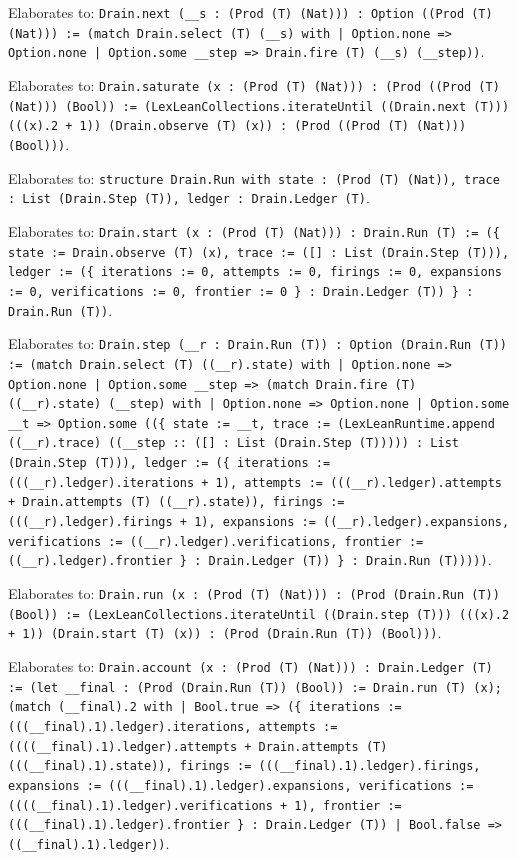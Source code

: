 \documentclass[11pt]{article}
\begin{document}
\noindent Elaborates to: \texttt{Drain.next (\_\_s : (Prod (T) (Nat))) : Option ((Prod (T) (Nat))) := (match Drain.select (T) (\_\_s) with | Option.none => Option.none | Option.some \_\_step => Drain.fire (T) (\_\_s) (\_\_step))}.\par
\noindent Elaborates to: \texttt{Drain.saturate (x : (Prod (T) (Nat))) : (Prod ((Prod (T) (Nat))) (Bool)) := (LexLeanCollections.iterateUntil ((Drain.next (T))) (((x).2 + 1)) (Drain.observe (T) (x)) : (Prod ((Prod (T) (Nat))) (Bool)))}.\par
\noindent Elaborates to: \texttt{structure Drain.Run with state : (Prod (T) (Nat)), trace : List (Drain.Step (T)), ledger : Drain.Ledger (T)}.\par
\noindent Elaborates to: \texttt{Drain.start (x : (Prod (T) (Nat))) : Drain.Run (T) := (\{ state := Drain.observe (T) (x), trace := ([] : List (Drain.Step (T))), ledger := (\{ iterations := 0, attempts := 0, firings := 0, expansions := 0, verifications := 0, frontier := 0 \} : Drain.Ledger (T)) \} : Drain.Run (T))}.\par
\noindent Elaborates to: \texttt{Drain.step (\_\_r : Drain.Run (T)) : Option (Drain.Run (T)) := (match Drain.select (T) ((\_\_r).state) with | Option.none => Option.none | Option.some \_\_step => (match Drain.fire (T) ((\_\_r).state) (\_\_step) with | Option.none => Option.none | Option.some \_\_t => Option.some ((\{ state := \_\_t, trace := (LexLeanRuntime.append ((\_\_r).trace) ((\_\_step :: ([] : List (Drain.Step (T))))) : List (Drain.Step (T))), ledger := (\{ iterations := (((\_\_r).ledger).iterations + 1), attempts := (((\_\_r).ledger).attempts + Drain.attempts (T) ((\_\_r).state)), firings := (((\_\_r).ledger).firings + 1), expansions := ((\_\_r).ledger).expansions, verifications := ((\_\_r).ledger).verifications, frontier := ((\_\_r).ledger).frontier \} : Drain.Ledger (T)) \} : Drain.Run (T)))))}.\par
\noindent Elaborates to: \texttt{Drain.run (x : (Prod (T) (Nat))) : (Prod (Drain.Run (T)) (Bool)) := (LexLeanCollections.iterateUntil ((Drain.step (T))) (((x).2 + 1)) (Drain.start (T) (x)) : (Prod (Drain.Run (T)) (Bool)))}.\par
\noindent Elaborates to: \texttt{Drain.account (x : (Prod (T) (Nat))) : Drain.Ledger (T) := (let \_\_final : (Prod (Drain.Run (T)) (Bool)) := Drain.run (T) (x); (match (\_\_final).2 with | Bool.true => (\{ iterations := (((\_\_final).1).ledger).iterations, attempts := ((((\_\_final).1).ledger).attempts + Drain.attempts (T) (((\_\_final).1).state)), firings := (((\_\_final).1).ledger).firings, expansions := (((\_\_final).1).ledger).expansions, verifications := ((((\_\_final).1).ledger).verifications + 1), frontier := (((\_\_final).1).ledger).frontier \} : Drain.Ledger (T)) | Bool.false => ((\_\_final).1).ledger))}.\par
\end{document}
